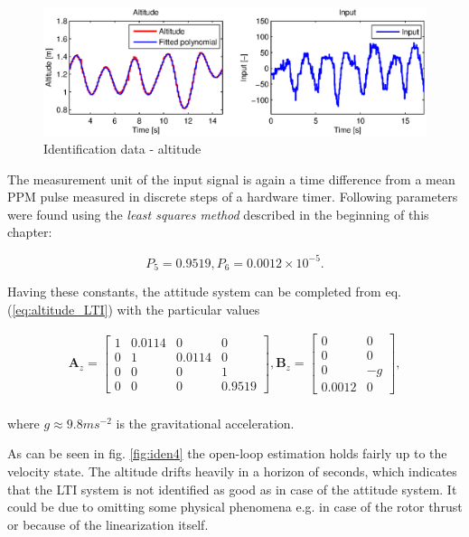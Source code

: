 \begin{figure}[h]
\includegraphics[width=1\textwidth]{fig/iden3.eps} 
\caption{Identification data - altitude}
\label{fig:iden3}
\end{figure}

The measurement unit of the input signal is again a time difference from a mean PPM pulse measured in discrete steps of a hardware timer. Following parameters were found using the \emph{least squares method} described in the beginning of this chapter:

\begin{equation}
P_5 = 0.9519, P_6 = 0.0012 \times 10^{-5}.
\label{eq:constants2}
\end{equation}

Having these constants, the attitude system can be completed from eq. (\ref{eq:altitude_LTI}) with the particular values

\begin{equation}
\begin{split}
\mathbf{A}_{z} = \begin{bmatrix}
1 & 0.0114 & 0 & 0\\
0 & 1 & 0.0114 & 0\\
0 & 0 & 0 & 1 \\
0 & 0 & 0 & 0.9519
\end{bmatrix}, \mathbf{B}_{z} = \begin{bmatrix}
0 & 0\\
0 & 0\\
0 & -g\\
0.0012 & 0
\end{bmatrix},
\end{split}
\label{eq:altitude_LTI_with_constants}
\end{equation}
\\
where $g \approx 9.8 ms^{-2}$ is the gravitational acceleration.

As can be seen in fig. \ref{fig:iden4} the open-loop estimation holds fairly up to the velocity state. The altitude drifts heavily in a horizon of seconds, which indicates that the LTI system is not identified as good as in case of the attitude system. It could be due to omitting some physical phenomena e.g. in case of the rotor thrust or because of the linearization itself.

